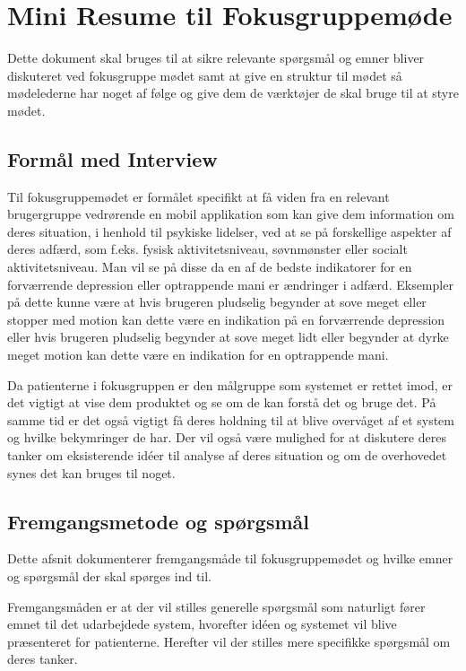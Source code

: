 \chapter{Mini Resume til Fokusgruppemøde}
Dette dokument skal bruges til at sikre relevante spørgsmål og emner bliver diskuteret ved fokusgruppe mødet samt at give en struktur til mødet så mødelederne har noget af følge og give dem de værktøjer de skal bruge til at styre mødet.

\section{Formål med Interview}
Til fokusgruppemødet er formålet specifikt at få viden fra en relevant brugergruppe vedrørende en mobil applikation som kan give dem information om deres situation, i henhold til psykiske lidelser, ved at se på forskellige aspekter af deres adfærd, som f.eks. fysisk aktivitetsniveau, søvnmønster eller socialt aktivitetsniveau. 
Man vil se på disse da en af de bedste indikatorer for en forværrende depression eller optrappende mani er ændringer i adfærd.
Eksempler på dette kunne være at hvis brugeren pludselig begynder at sove meget eller stopper med motion kan dette være en indikation på en forværrende depression eller hvis brugeren pludselig begynder at sove meget lidt eller begynder at dyrke meget motion kan dette være en indikation for en optrappende mani.
 
Da patienterne i fokusgruppen er den målgruppe som systemet er rettet imod, er det vigtigt at vise dem produktet og se om de kan forstå det og bruge det.
På samme tid er det også vigtigt få deres holdning til at blive overvåget af et system og hvilke bekymringer de har.
Der vil også være mulighed for at diskutere deres tanker om eksisterende idéer til analyse af deres situation og om de overhovedet synes det kan bruges til noget.

\section{Fremgangsmetode og spørgsmål}
Dette afsnit dokumenterer fremgangsmåde til fokusgruppemødet og hvilke emner og spørgsmål der skal spørges ind til.

Fremgangsmåden er at der vil stilles generelle spørgsmål som naturligt fører emnet til det udarbejdede system, hvorefter idéen og systemet vil blive præsenteret for patienterne. 
Herefter vil der stilles mere specifikke spørgsmål om deres tanker.

